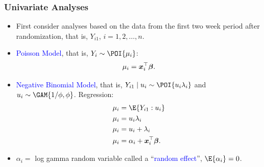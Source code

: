 \documentclass[oneside]{book}\usepackage[]{graphicx}\usepackage[svgnames]{xcolor}
\providecommand\given{} %
\renewcommand\given{\nonscript\:\delimsize\vert\nonscript\:\mathopen{}}%
\renewcommand\given{\nonscript\:\delimsize\vert\nonscript\:\mathopen{}}%
\renewcommand\given{\nonscript\:\delimsize\vert\nonscript\:\mathopen{}}%
\renewcommand\given{\nonscript\:\delimsize\vert\nonscript\:\mathopen{}}%
\renewcommand\given{\nonscript\:\delimsize\vert\nonscript\:\mathopen{}}%
\renewcommand\given{\nonscript\:\delimsize\vert\nonscript\:\mathopen{}}%
\renewcommand\given{\nonscript\:\delimsize\vert\nonscript\:\mathopen{}}%
\renewcommand\given{\nonscript\:\delimsize\vert\nonscript\:\mathopen{}}%
\renewcommand\given{\nonscript\:\delimsize\vert\nonscript\:\mathopen{}}%
\renewcommand\given{\nonscript\:\delimsize\vert\nonscript\:\mathopen{}}%
\renewcommand\given{\nonscript\:\delimsize\vert\nonscript\:\mathopen{}}%
\renewcommand\given{\nonscript\:\delimsize\vert\nonscript\:\mathopen{}}%
\let\log\relax%
\renewcommand\given{:}
\providecommand{\Vector}[1]{\bm{#1}}%
\begin{document}
\subsubsection*{Univariate Analyses}
\begin{itemize}
      \item First consider analyses based on the data from the first two week period after
            randomization, that is, $ Y_{i1} $, $ i=1,2,\ldots,n $.
      \item \textcolor{Blue}{Poisson Model}, that is, $ Y_i \sim \POI{\mu_i} $:
            \[ \log{\mu_i}=\Vector{x}_i^\top \Vector{\beta}. \]
      \item \textcolor{Blue}{Negative Binomial Model}, that is, $ Y_{i1}\mid u_i \sim \POI{u_i\lambda_i} $ and $ u_i \sim \GAM{1/\phi,\phi} $. Regression:
            \begin{align*}
                  \mu_i       & =\E{Y_{i1}\given u_i}                       \\
                  \mu_i       & =u_i\lambda_i                               \\
                  \log{\mu_i} & =\log{u_i}+\log{\lambda_i}                  \\
                  \log{\mu_i} & =\alpha_i+\Vector{x}_i^\top \Vector{\beta}.
            \end{align*}
      \item $ \alpha_i= $ log gamma random variable called a ``\textcolor{Blue}{random effect}'', $ \E{\alpha_i}=0 $.
\end{itemize}
\end{document}
